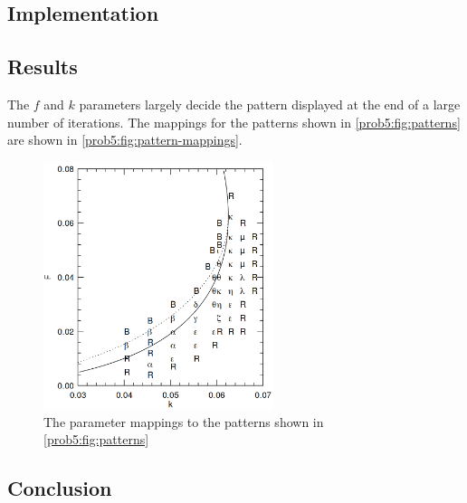\subsection{Implementation}
\subsection{Results}
The $f$ and $k$ parameters largely decide the pattern displayed at the end of a large number of iterations.
The mappings for the patterns shown in \autoref{prob5:fig:patterns} are shown in \autoref{prob5:fig:pattern-mappings}.
\begin{figure}[H]
    \centering
    \includegraphics[width=0.6\textwidth]{figures/reactions/pattern-mappings.png}
    \caption{The parameter mappings to the patterns shown in \autoref{prob5:fig:patterns}}\label{prob5:fig:pattern-mappings}
\end{figure}
\subsection{Conclusion}
